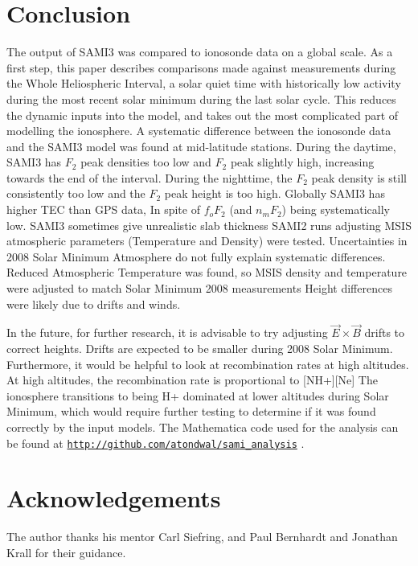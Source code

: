 \documentclass[12pt]{IEEEtran}
\begin{document}
\section{Conclusion}
\IEEEPARstart T{he} output of SAMI3 was compared to ionosonde data on a global scale. As a first step, this paper describes comparisons made against measurements during the Whole Heliospheric Interval, a solar quiet time with historically low activity during the most recent solar minimum during the last solar cycle.  This reduces the dynamic inputs into the model, and takes out the most complicated part of modelling the ionosphere. 
  A systematic difference between the ionosonde data and the SAMI3 model was found at mid-latitude stations. During the daytime, SAMI3 has $F_2$ peak densities too low and $F_2$ peak slightly high, increasing towards the end of the interval.
  During the nighttime, the $F_2$  peak density is still consistently too low and the $F_2$ peak height is too high.
         Globally SAMI3 has higher TEC than GPS data, In spite of $f_oF_2$ (and $n_mF_2$) being systematically low.
         SAMI3 sometimes give unrealistic slab thickness 
   SAMI2 runs adjusting MSIS atmospheric parameters (Temperature and Density) were tested.
        Uncertainties in 2008 Solar Minimum Atmosphere do not fully explain systematic differences.
	Reduced Atmospheric Temperature was found, so MSIS density and temperature were adjusted to match Solar Minimum 2008 measurements
        Height differences were likely due to drifts and winds.
	  
	In the future, for further research, it is advisable to try adjusting $\vec E\times\vec B$ drifts to correct heights.
	    Drifts are expected to be smaller during 2008 Solar Minimum.
        Furthermore, it would be helpful to look at recombination rates at high altitudes.
	   At high altitudes, the recombination rate is proportional to [NH+][Ne]
	   The ionosphere transitions to being H+ dominated at lower altitudes during Solar Minimum, which would require further testing to determine if it was found correctly by the input models. The Mathematica code used for the analysis can be found at \texttt{\url{http://github.com/atondwal/sami_analysis}} .
\section{Acknowledgements}
 The author thanks his mentor Carl Siefring, and Paul Bernhardt and Jonathan Krall for their guidance.
\nocite{*}


\end{document}
